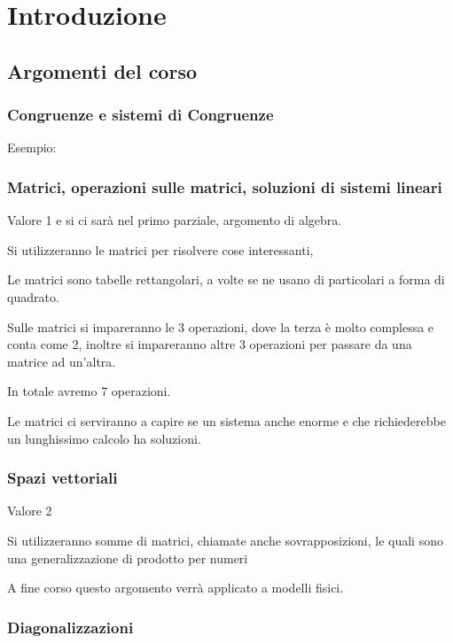 \chapter{Introduzione}
\section{Argomenti del corso}
\subsection{Congruenze e sistemi di Congruenze}
Esempio:

\subsection{Matrici, operazioni sulle matrici, soluzioni di sistemi lineari}



Valore 1 e si ci sarà nel primo parziale, argomento di algebra.



Si utilizzeranno le matrici per risolvere cose interessanti,

Le matrici sono tabelle rettangolari, a volte se ne usano di particolari a forma di quadrato.

Sulle matrici si impareranno le 3 operazioni, dove la terza è molto complessa e conta come 2, inoltre si impareranno altre 3 operazioni per passare da una matrice ad un'altra. 

In totale avremo 7 operazioni.

Le matrici ci serviranno a capire se un sistema anche enorme e che richiederebbe un lunghissimo calcolo ha soluzioni.

\subsection{Spazi vettoriali}

Valore 2

Si utilizzeranno somme di matrici, chiamate anche sovrapposizioni, le quali sono una generalizzazione di prodotto per numeri %

A fine corso questo argomento verrà applicato a modelli fisici.

\subsection{Diagonalizzazioni}

